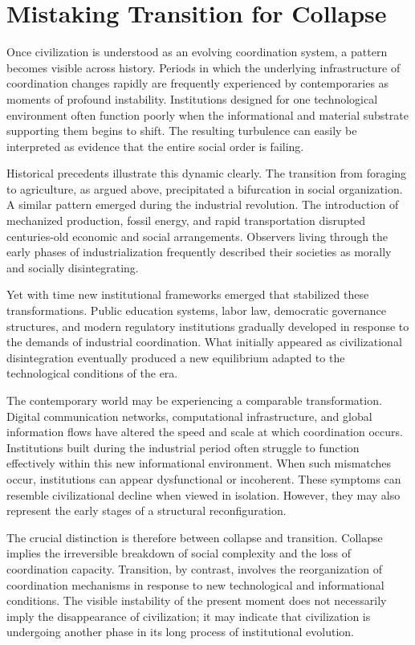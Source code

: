 \documentclass[12pt]{article}
\begin{document}
\section{Mistaking Transition for Collapse}

Once civilization is understood as an evolving coordination system, a pattern becomes visible across history. Periods in which the underlying infrastructure of coordination changes rapidly are frequently experienced by contemporaries as moments of profound instability. Institutions designed for one technological environment often function poorly when the informational and material substrate supporting them begins to shift. The resulting turbulence can easily be interpreted as evidence that the entire social order is failing.

Historical precedents illustrate this dynamic clearly. The transition from foraging to agriculture, as argued above, precipitated a bifurcation in social organization. A similar pattern emerged during the industrial revolution. The introduction of mechanized production, fossil energy, and rapid transportation disrupted centuries-old economic and social arrangements. Observers living through the early phases of industrialization frequently described their societies as morally and socially disintegrating.

Yet with time new institutional frameworks emerged that stabilized these transformations. Public education systems, labor law, democratic governance structures, and modern regulatory institutions gradually developed in response to the demands of industrial coordination. What initially appeared as civilizational disintegration eventually produced a new equilibrium adapted to the technological conditions of the era.

The contemporary world may be experiencing a comparable transformation. Digital communication networks, computational infrastructure, and global information flows have altered the speed and scale at which coordination occurs. Institutions built during the industrial period often struggle to function effectively within this new informational environment. When such mismatches occur, institutions can appear dysfunctional or incoherent. These symptoms can resemble civilizational decline when viewed in isolation. However, they may also represent the early stages of a structural reconfiguration.

The crucial distinction is therefore between collapse and transition. Collapse implies the irreversible breakdown of social complexity and the loss of coordination capacity. Transition, by contrast, involves the reorganization of coordination mechanisms in response to new technological and informational conditions. The visible instability of the present moment does not necessarily imply the disappearance of civilization; it may indicate that civilization is undergoing another phase in its long process of institutional evolution.
\end{document}
